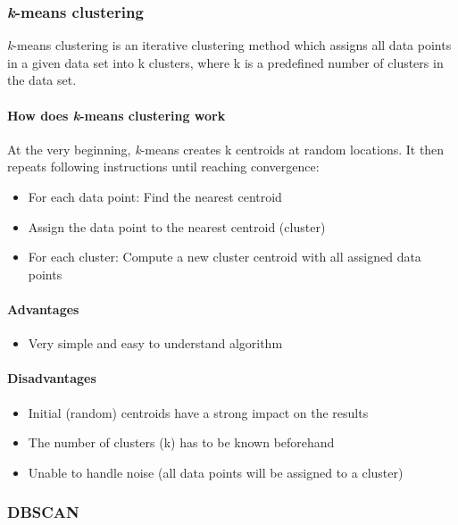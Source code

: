\subsubsection{\textit{k}-means clustering}
\label{subsubsec:3_kmeans_clustering}

\textit{k}-means clustering is an iterative clustering method which assigns all data points in a given data set
into k clusters, where k is a predefined number of clusters in the data set.

\paragraph{How does \textit{k}-means clustering work}
At the very beginning, \textit{k}-means creates k centroids at random locations.
It then repeats following instructions until reaching convergence:

\begin{itemize}
    \item For each data point: Find the nearest centroid
    \item Assign the data point to the nearest centroid (cluster)
    \item For each cluster: Compute a new cluster centroid with all assigned data points
\end{itemize}

\paragraph{Advantages}
\begin{itemize}
    \item Very simple and easy to understand algorithm
\end{itemize}

\paragraph{Disadvantages}
\begin{itemize}
    \item Initial (random) centroids have a strong impact on the results
    \item The number of clusters (k) has to be known beforehand
    \item Unable to handle noise (all data points will be assigned to a cluster)
\end{itemize}

\subsubsection{DBSCAN}
\label{subsubsec:3_dbscan}

